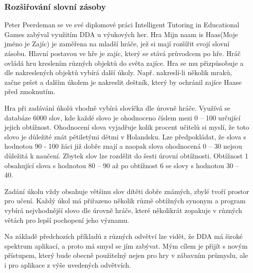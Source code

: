 \subsubsection{Rozšiřování slovní zásoby}

Peter Peerdeman se ve své diplomové práci Intelligent Tutoring in Educational Games\cite{14Haas} zabýval využitím DDA u výukových her. Hra Mijn naam is Haas(Moje jméno je Zajíc) je zaměřena na mladší hráče, jež si mají rozšířit svojí slovní zásobu. Hlavní postavou ve hře je zajíc, který se stává průvodcem po hře. Hráč ovládá hru kreslením různých objektů do světa zajíce. Hra se mu přizpůsobuje a dle nakreslených objektů vybírá další úkoly. Např. nakreslí-li několik mraků, začne pršet a dalším úkolem je nakreslit deštník, který by ochránil zajíce Haase před zmoknutím.

Hra při zadávání úkolů vhodně vybírá slovíčka dle úrovně hráče. Využívá se databáze 6000 slov, kde každé slovo je ohodnoceno číslem mezi 0 – 100 určující jejich obtížnost. Ohodnocení slova vyjadřuje kolik procent učitelů si myslí, že toto slovo je důležité znát pětiletými dětmi v Holandsku. Lze předpokládat, že slova s hodnotou 90 - 100 žáci již dobře znají a naopak slova ohodnocená 0 – 30 nejsou důležitá k naučení. Zbytek slov lze rozdělit do šesti úrovní obtížnosti. Obtížnost 1 obsahující slova s hodnotou 80 – 90 až po obtížnost 6 se slovy s hodnotou 30 – 40.

Zadání úkolu vždy obsahuje většinu slov dítěti dobře známých, zbylé tvoří prostor pro učení. Každý úkol má přiřazeno několik různě obtížných synonym a program vybírá nejvhodnější slovo dle úrovně hráče, které několikrát zopakuje v různých větách pro lepší pochopení jeho významu.

\vspace{8mm}

Na základě předchozích příkladů z různých odvětví lze vidět, že DDA má široké spektrum aplikací, a proto má smysl se jím zabývat. Mým cílem je přijít s novým přístupem, který bude obecně použitelný nejen pro hry v zábavním průmyslu, ale i pro aplikace z výše uvedených odvětvích.

\endinput
